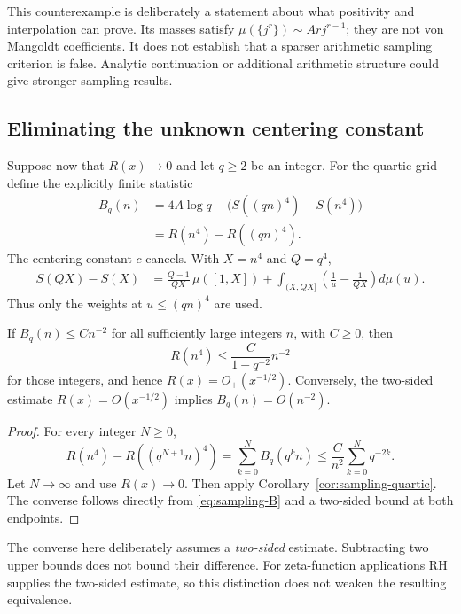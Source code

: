 This counterexample is deliberately a statement about what positivity
and interpolation can prove. Its masses satisfy
$\mu(\{j^r\})\sim Arj^{r-1}$; they are not von Mangoldt coefficients.
It does not establish that a sparser arithmetic sampling criterion is
false. Analytic continuation or additional arithmetic structure could
give stronger sampling results.

\subsection{Eliminating the unknown centering constant}

Suppose now that $R(x)\to0$ and let $q\ge2$ be an integer. For
the quartic grid define the explicitly finite statistic
\begin{align}
 B_q(n)&=4A\log q-\bigl(S((qn)^4)-S(n^4)\bigr)\label{eq:sampling-B}\\
 &=R(n^4)-R((qn)^4).\nonumber
\end{align}
The centering constant $c$ cancels. With $X=n^4$ and $Q=q^4$,
\begin{align}
 S(QX)-S(X)
 &=\frac{Q-1}{QX}\,\mu([1,X])
   +\int_{(X,QX]}\left(\frac1u-\frac1{QX}\right)d\mu(u).
 \label{eq:sampling-finite-increment}
\end{align}
Thus only the weights at $u\le(qn)^4$ are used.

\begin{proposition}\label{prop:sampling-certificate}
If $B_q(n)\le Cn^{-2}$ for all sufficiently large integers $n$,
with $C\ge0$, then
\[
 R(n^4)\le\frac{C}{1-q^{-2}}n^{-2}
\]
for those integers, and hence $R(x)=O_+(x^{-1/2})$.
Conversely, the two-sided estimate $R(x)=O(x^{-1/2})$ implies
$B_q(n)=O(n^{-2})$.
\end{proposition}

\begin{proof}
For every integer $N\ge0$,
\[
 R(n^4)-R((q^{N+1}n)^4)=\sum_{k=0}^{N}B_q(q^kn)
 \le\frac{C}{n^2}\sum_{k=0}^{N}q^{-2k}.
\]
Let $N\to\infty$ and use $R(x)\to0$. Then apply
Corollary~\ref{cor:sampling-quartic}. The converse follows directly
from \eqref{eq:sampling-B} and a two-sided bound at both endpoints.
\end{proof}

The converse here deliberately assumes a \emph{two-sided} estimate.
Subtracting two upper bounds does not bound their difference.
For zeta-function applications RH supplies the two-sided estimate, so
this distinction does not weaken the resulting equivalence.

